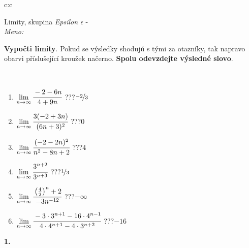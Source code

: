 \documentclass[10pt]{report}
\begin{document}
\begin{tabular}{c:c}
\begin{minipage}[c][104.5mm][t]{0.5\linewidth}
\begin{center}
\vspace{7mm}
{\huge Limity, skupina \textit{Epsilon $\epsilon$} -}\\[5mm]
\textit{Meno:}\phantom{xxxxxxxxxxxxxxxxxxxxxxxxxxxxxxxxxxxxxxxxxxxxxxxxxxxxxxxxxxxxxxxxx}\\[5mm]
\begin{minipage}{0.95\linewidth}
\begin{center}
\textbf{Vypočti limity}. Pokud se výsledky shodujú s tými za otazníky, tak napravo\\obarvi příslušející kroužek načerno. \textbf{Spolu odevzdejte výsledné slovo}.
\end{center}
\end{minipage}
\\[1mm]
\begin{minipage}{0.79\linewidth}
\begin{center}
\begin{varwidth}{\linewidth}
\begin{enumerate}
\normalsize
\item $\lim\limits_{n\to\infty}\cfrac{-2-6n}{4+9n}$\quad \dotfill\; ???\;\dotfill \quad $\nicefrac{-2}{3}$
\item $\lim\limits_{n\to\infty}\cfrac{3(-2+3n)}{(6n+3)^2}$\quad \dotfill\; ???\;\dotfill \quad $0$
\item $\lim\limits_{n\to\infty}\cfrac{(-2-2n)^2}{n^2-8n+2}$\quad \dotfill\; ???\;\dotfill \quad $4$
\item $\lim\limits_{n\to\infty}\cfrac{3^{n+2}}{3^{n+3}}$\quad \dotfill\; ???\;\dotfill \quad $\nicefrac{1}{3}$
\item $\lim\limits_{n\to\infty}\cfrac{\left(\frac{4}{2}\right)^n +2}{-3n^{-12}}$\quad \dotfill\; ???\;\dotfill \quad $-\infty$
\item $\lim\limits_{n\to\infty}\cfrac{-3\cdot 3^{n+1}-16\cdot 4^{n-1}}{4\cdot 4^{n+1}-4\cdot 3^{n+2}}$\quad \dotfill\; ???\;\dotfill \quad $-16$
\end{enumerate}
\end{varwidth}
\end{center}
\end{minipage}
\begin{minipage}{0.20\linewidth}
\begin{center}
{\Huge\bfseries 1.} \\[2mm]

\end{center}
\end{minipage}
\end{center}
\end{minipage}
\end{tabular}
\end{document}
